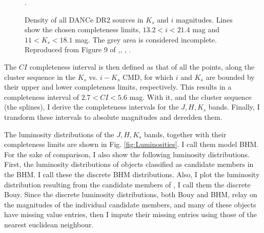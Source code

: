 \begin{figure}[htbp]
\begin{center}
\caption{Density of all DANCe DR2 sources in $K_s$ and $i$ magnitudes. Lines show the chosen completeness limits, $13.2<i<21.4$ mag and $11<K_s<18.1$ mag. The grey area is considered incomplete. Reproduced from Figure 9 of \citet{Olivares2017},\textit{}, , .}
\label{fig:completeness}.
\end{center}
\end{figure}

The $CI$ completeness interval is then defined as that of all the points, along the cluster sequence in the $K_s$ vs. $i-K_s$ CMD, for which $i$ and $K_s$ are bounded by their upper and lower completeness limits, respectively. This results in a completeness interval of  $2.7<CI<5.6$ mag. With it, and the cluster sequence (the splines), I derive the completeness intervals for the $J,H,K_s$ bands. Finally, I transform these intervals to absolute magnitudes and deredden them. 

The luminosity distributions of the $J,H,K_s$ bands, together with their completeness limits are shown in Fig. \ref{fig:Luminosities}. I call them model BHM. For the sake of comparison, I also show the following luminosity distributions. First, the luminosity distributions of objects classified as candidate members in the BHM. I call these the discrete BHM distributions. Also, I plot the luminosity distribution resulting from the candidate members of \citet{Bouy2015}, I call them the discrete Bouy. Since the discrete luminosity distributions, both Bouy and BHM, relay on the magnitudes of the individual candidate members, and many of these objects have missing value entries, then I impute their missing entries using those of the nearest euclidean neighbour. 

